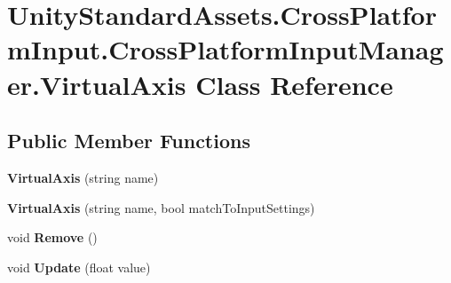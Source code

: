 \hypertarget{class_unity_standard_assets_1_1_cross_platform_input_1_1_cross_platform_input_manager_1_1_virtual_axis}{}\section{Unity\+Standard\+Assets.\+Cross\+Platform\+Input.\+Cross\+Platform\+Input\+Manager.\+Virtual\+Axis Class Reference}
\label{class_unity_standard_assets_1_1_cross_platform_input_1_1_cross_platform_input_manager_1_1_virtual_axis}
\subsection*{Public Member Functions}
\begin{DoxyCompactItemize}
\item 
{\bfseries Virtual\+Axis} (string name)\hypertarget{class_unity_standard_assets_1_1_cross_platform_input_1_1_cross_platform_input_manager_1_1_virtual_axis_a051ce3991988d9ff11efe81e73491a68}{}\label{class_unity_standard_assets_1_1_cross_platform_input_1_1_cross_platform_input_manager_1_1_virtual_axis_a051ce3991988d9ff11efe81e73491a68}

\item 
{\bfseries Virtual\+Axis} (string name, bool match\+To\+Input\+Settings)\hypertarget{class_unity_standard_assets_1_1_cross_platform_input_1_1_cross_platform_input_manager_1_1_virtual_axis_a4d1d1be133e80ab963a3ed6e3186971e}{}\label{class_unity_standard_assets_1_1_cross_platform_input_1_1_cross_platform_input_manager_1_1_virtual_axis_a4d1d1be133e80ab963a3ed6e3186971e}

\item 
void {\bfseries Remove} ()\hypertarget{class_unity_standard_assets_1_1_cross_platform_input_1_1_cross_platform_input_manager_1_1_virtual_axis_af4dc5cd83e45dc874b7b659f03cdc926}{}\label{class_unity_standard_assets_1_1_cross_platform_input_1_1_cross_platform_input_manager_1_1_virtual_axis_af4dc5cd83e45dc874b7b659f03cdc926}

\item 
void {\bfseries Update} (float value)\hypertarget{class_unity_standard_assets_1_1_cross_platform_input_1_1_cross_platform_input_manager_1_1_virtual_axis_a53ab054e60e6e33fad9a62283786d962}{}\label{class_unity_standard_assets_1_1_cross_platform_input_1_1_cross_platform_input_manager_1_1_virtual_axis_a53ab054e60e6e33fad9a62283786d962}

\end{DoxyCompactItemize}
